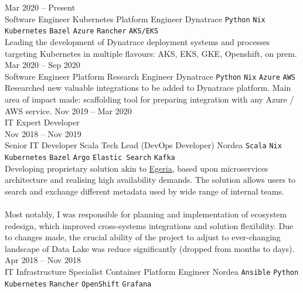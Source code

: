 \documentclass[9pt]{style/developercv}
\begin{document}
\begin{entrylist}
	\entry
	  {Mar 2020 -- Present\\\footnotesize{Software Engineer}}
		{Kubernetes Platform Engineer}
		{Dynatrace}
		{
			\texttt{Python}\slashsep
			\texttt{Nix}\slashsep
			\texttt{Kubernetes}\slashsep
			\texttt{Bazel}\slashsep
			\texttt{Azure}\slashsep
			\texttt{Rancher}\slashsep
			\texttt{AKS/EKS}\\

			Leading the development of Dynatrace deployment systems and processes targeting Kubernetes in
			multiple flavours: AKS, EKS, GKE, Openshift, on prem.
	  }
	\entry
	  {Mar 2020 -- Sep 2020\\\footnotesize{Software Engineer}}
		{Platform Research Engineer}
		{Dynatrace}
		{
			\texttt{Python}\slashsep
			\texttt{Nix}\slashsep
			\texttt{Azure}\slashsep
			\texttt{AWS}\\

			Researched new valuable integrations to be added to Dynatrace platform. 
			Main area of impact made: scaffolding tool for preparing integration with any
			Azure / AWS service.
	  }
	\entry
		{Nov 2019 -- Mar 2020\\\footnotesize{IT Expert Developer}
		\\Nov 2018 -- Nov 2019\\\footnotesize{Senior IT Developer}}
		{Scala Tech Lead (DevOps Developer)}
		{Nordea}
		{
			\texttt{Scala}\slashsep
			\texttt{Nix}\slashsep
			\texttt{Kubernetes}\slashsep
			\texttt{Bazel}\slashsep
			\texttt{Argo}\slashsep
			\texttt{Elastic Search}\slashsep
			\texttt{Kafka}\\

			Developing proprietary solution akin to 
			\href{https://egeria.odpi.org}{Egeria}, based upon microservices 
			architecture and realising high availability demands. The solution
			allows users to search and exchange different metadata used by wide
			range of internal teams.\\ \\
			Most notably, I was responsible for planning and implementation of 
			ecosystem redesign, which improved cross-systems integrations and 
			solution flexibility. Due to changes made, the crucial ability of 
			the project to adjust to ever-changing landscape of Data Lake was
			reduce significantly (dropped from months to days). \\
		}
	\entry
		{Apr 2018 -- Nov 2018\\\footnotesize{IT Infrastructure Specialist}}
		{Container Platform Engineer}
		{Nordea}
		{
			\texttt{Ansible}\slashsep
			\texttt{Python}\slashsep
			\texttt{Kubernetes}\slashsep
			\texttt{Rancher}\slashsep
			\texttt{OpenShift}\slashsep
			\texttt{Grafana}\\

}
\end{entrylist}
\end{document}
